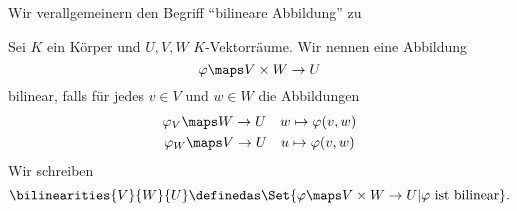 Wir verallgemeinern den Begriff \enquote{bilineare Abbildung} zu
\begin{definition*}
  Sei \( K \) ein Körper und \( U,V,W \) \( K \)-Vektorräume. Wir nennen eine Abbildung
  \begin{equation*}
    \varphi\maps V\times W\to U
  \end{equation*}
  bilinear, falls für jedes \( v\in V \) und \( w\in W \) die Abbildungen
  \begin{gather*}
    \varphi_V\maps W\to U\quad w\mapsto \varphi(v,w)\\
    \varphi_W\maps V\to U\quad u\mapsto \varphi(v,w)
  \end{gather*}
  Wir schreiben
  \begin{equation*}
    \bilinearities{V}{W}{U}\definedas \Set{\varphi\maps V\times W\to U| \varphi \text{ ist bilinear}}.
  \end{equation*}
\end{definition*}
